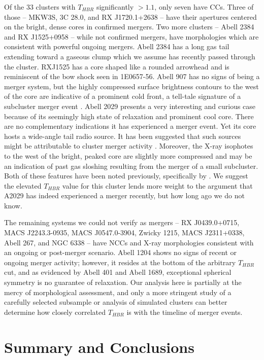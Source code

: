 \documentclass[apj]{emulateapj}
\begin{document}
Of the 33 clusters with $T_{HBR}$ significantly $> 1.1$, only seven
have CCs. Three of those -- MKW3S, 3C 28.0, and RX J1720.1+2638 -- have
their apertures centered on the bright, dense cores in confirmed
mergers. Two more clusters -- Abell 2384 and RX J1525+0958 -- while not
confirmed mergers, have morphologies which are consistent with
powerful ongoing mergers. Abell 2384 has a long gas tail extending
toward a gaseous clump which we assume has recently passed through the
cluster. RXJ1525 has a core shaped like a rounded arrowhead and is
reminiscent of the bow shock seen in 1E0657-56. Abell 907 has no signs
of being a merger system, but the highly compressed surface brightness
contours to the west of the core are indicative of a prominent cold
front, a tell-tale signature of a subcluster merger event
\citep{2007PhR...443....1M}. Abell 2029 presents a very interesting
and curious case because of its seemingly high state of relaxation and
prominent cool core. There are no complementary indications it has
experienced a merger event. Yet its core hosts a wide-angle tail
radio source. It has been suggested that such sources might be
attributable to cluster merger activity
\citep{2000MNRAS.311..649S}. Moreover, the X-ray isophotes to the west
of the bright, peaked core are slightly more compressed and may be an
indication of past gas sloshing resulting from the merger of a small
subcluster. Both of these features have been noted previously,
specifically by \cite{2004ApJ...616..178C, 2005xrrc.procE7.08C}. We
suggest the elevated $T_{HBR}$ value for this cluster lends more
weight to the argument that A2029 has indeed experienced a merger
recently, but how long ago we do not know.

The remaining systems we could not verify as mergers -- RX
J0439.0+0715, MACS J2243.3-0935, MACS J0547.0-3904, Zwicky 1215, MACS
J2311+0338, Abell 267, and NGC 6338 -- have NCCs and X-ray
morphologies consistent with an ongoing or post-merger scenario. Abell
1204 shows no signs of recent or ongoing merger activity; however, it
resides at the bottom of the arbitrary $T_{HBR}$ cut, and as evidenced
by Abell 401 and Abell 1689, exceptional spherical symmetry is no
guarantee of relaxation. Our analysis here is partially at the mercy
of morphological assessment, and only a more stringent study of a
carefully selected subsample or analysis of simulated clusters can
better determine how closely correlated $T_{HBR}$ is with the timeline
of merger events.

\section{Summary and Conclusions}\label{sec:summary}
\end{document}
